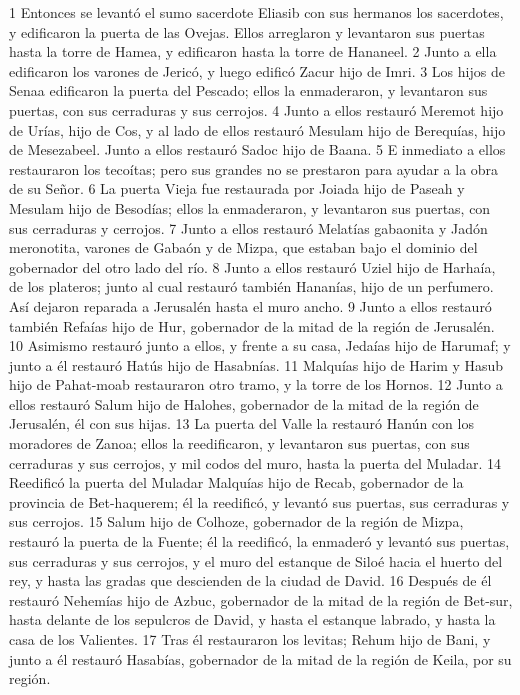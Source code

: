 1 Entonces se levantó el sumo sacerdote Eliasib con sus hermanos los sacerdotes, y edificaron la puerta de las Ovejas. Ellos arreglaron y levantaron sus puertas hasta la torre de Hamea, y edificaron hasta la torre de Hananeel.
2 Junto a ella edificaron los varones de Jericó, y luego edificó Zacur hijo de Imri.
3 Los hijos de Senaa edificaron la puerta del Pescado; ellos la enmaderaron, y levantaron sus puertas, con sus cerraduras y sus cerrojos.
4 Junto a ellos restauró Meremot hijo de Urías, hijo de Cos, y al lado de ellos restauró Mesulam hijo de Berequías, hijo de Mesezabeel. Junto a ellos restauró Sadoc hijo de Baana.
5 E inmediato a ellos restauraron los tecoítas; pero sus grandes no se prestaron para ayudar a la obra de su Señor.
6 La puerta Vieja fue restaurada por Joiada hijo de Paseah y Mesulam hijo de Besodías; ellos la enmaderaron, y levantaron sus puertas, con sus cerraduras y cerrojos.
7 Junto a ellos restauró Melatías gabaonita y Jadón meronotita, varones de Gabaón y de Mizpa, que estaban bajo el dominio del gobernador del otro lado del río.
8 Junto a ellos restauró Uziel hijo de Harhaía, de los plateros; junto al cual restauró también Hananías, hijo de un perfumero. Así dejaron reparada a Jerusalén hasta el muro ancho.
9 Junto a ellos restauró también Refaías hijo de Hur, gobernador de la mitad de la región de Jerusalén.
10 Asimismo restauró junto a ellos, y frente a su casa, Jedaías hijo de Harumaf; y junto a él restauró Hatús hijo de Hasabnías.
11 Malquías hijo de Harim y Hasub hijo de Pahat-moab restauraron otro tramo, y la torre de los Hornos.
12 Junto a ellos restauró Salum hijo de Halohes, gobernador de la mitad de la región de Jerusalén, él con sus hijas.
13 La puerta del Valle la restauró Hanún con los moradores de Zanoa; ellos la reedificaron, y levantaron sus puertas, con sus cerraduras y sus cerrojos, y mil codos   del muro, hasta la puerta del Muladar.
14 Reedificó la puerta del Muladar Malquías hijo de Recab, gobernador de la provincia de Bet-haquerem; él la reedificó, y levantó sus puertas, sus cerraduras y sus cerrojos.
15 Salum hijo de Colhoze, gobernador de la región de Mizpa, restauró la puerta de la Fuente; él la reedificó, la enmaderó y levantó sus puertas, sus cerraduras y sus cerrojos, y el muro del estanque de Siloé hacia el huerto del rey, y hasta las gradas que descienden de la ciudad de David.
16 Después de él restauró Nehemías hijo de Azbuc, gobernador de la mitad de la región de Bet-sur, hasta delante de los sepulcros de David, y hasta el estanque labrado, y hasta la casa de los Valientes.
17 Tras él restauraron los levitas; Rehum hijo de Bani, y junto a él restauró Hasabías, gobernador de la mitad de la región de Keila, por su región.
